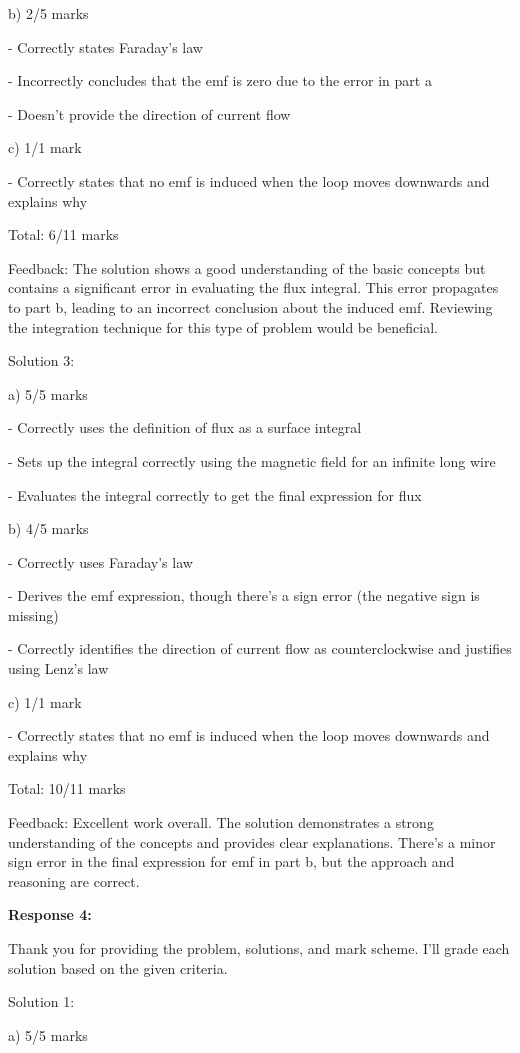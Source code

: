 \documentclass[a4paper,11pt]{article}
\begin{document}
b) 2/5 marks

- Correctly states Faraday's law

- Incorrectly concludes that the emf is zero due to the error in part a

- Doesn't provide the direction of current flow

c) 1/1 mark

- Correctly states that no emf is induced when the loop moves downwards and explains why

Total: 6/11 marks

Feedback: The solution shows a good understanding of the basic concepts but contains a significant error in evaluating the flux integral. This error propagates to part b, leading to an incorrect conclusion about the induced emf. Reviewing the integration technique for this type of problem would be beneficial.

Solution 3:

a) 5/5 marks

- Correctly uses the definition of flux as a surface integral

- Sets up the integral correctly using the magnetic field for an infinite long wire

- Evaluates the integral correctly to get the final expression for flux

b) 4/5 marks

- Correctly uses Faraday's law

- Derives the emf expression, though there's a sign error (the negative sign is missing)

- Correctly identifies the direction of current flow as counterclockwise and justifies using Lenz's law

c) 1/1 mark

- Correctly states that no emf is induced when the loop moves downwards and explains why

Total: 10/11 marks

Feedback: Excellent work overall. The solution demonstrates a strong understanding of the concepts and provides clear explanations. There's a minor sign error in the final expression for emf in part b, but the approach and reasoning are correct.

\bigskip
\textbf{Response 4:}

Thank you for providing the problem, solutions, and mark scheme. I'll grade each solution based on the given criteria.

Solution 1:

a) 5/5 marks
\end{document}
